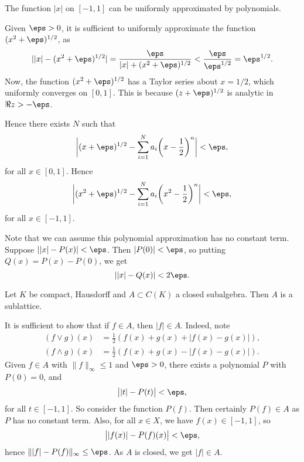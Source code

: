 \documentclass[12pt]{article}
\begin{document}
\begin{lemma}
	The function $|x|$ on $[-1,1]$ can be uniformly approximated by polynomials.
\end{lemma}

\begin{proofbox}
	Given $\eps > 0$, it is sufficient to uniformly approximate the function $(x^2 + \eps)^{1/2}$, as
	\[
	||x| - (x^2 + \eps)^{1/2}| = \frac{\eps}{|x| + (x^2 + \eps)^{1/2}} < \frac{\eps}{\eps^{1/2}} = \eps^{1/2}.
	\]
	Now, the function $(x^2 + \eps)^{1/2}$ has a Taylor series about $x = 1/2$, which uniformly converges on $[0, 1]$. This is because $(z + \eps)^{1/2}$ is analytic in $\Re z > -\eps$.

	Hence there exists $N$ such that
	\[
	\biggl|(x+\eps)^{1/2} - \sum_{i = 1}^{N} a_i \biggl( x - \frac{1}{2} \biggr)^{n} \biggr| < \eps,
	\]
	for all $x \in [0, 1]$. Hence
	\[
	\biggl|(x^2+\eps)^{1/2} - \sum_{i = 1}^{N} a_i \biggl( x^2 - \frac{1}{2} \biggr)^{n} \biggr| < \eps,
	\]
	for all $x \in [-1, 1]$.
\end{proofbox}

Note that we can assume this polynomial approximation has no constant term. Suppose $||x| - P(x)| < \eps$. Then $|P(0)| < \eps$, so putting $Q(x) = P(x) - P(0)$, we get
\[
||x| - Q(x)| < 2 \eps.
\]


\begin{theorem}
	Let $K$ be compact, Hausdorff and $A \subset C(K)$ a closed subalgebra. Then $A$ is a sublattice.
\end{theorem}

\begin{proofbox}
	It is sufficient to show that if $f \in A$, then $|f| \in A$. Indeed, note
	\begin{align*}
		(f \vee g)(x) &= \frac{1}{2}(f(x) + g(x) + |f(x) - g(x)|),\\
		(f \wedge g)(x) &= \frac{1}{2}(f(x) + g(x) - |f(x)-g(x)|).
	\end{align*}
	Given $f \in A$ with $\|f\|_\infty \leq 1$ and $\eps > 0$, there exists a polynomial $P$ with $P(0) = 0$, and
	\[
	\bigl| |t| - P(t)\bigr| < \eps,
	\]
	for all $t \in [-1,1]$. So consider the function $P(f)$. Then certainly $P(f) \in A$ as $P$ has no constant term. Also, for all $x \in X$, we have $f(x) \in [-1,1]$, so
	\[
	\bigl| |f(x)| - P(f)(x) \bigr| < \eps,
	\]
	hence $\| |f| - P(f)\|_\infty \le \eps$. As $A$ is closed, we get $|f| \in A$.
\end{proofbox}
\end{document}
